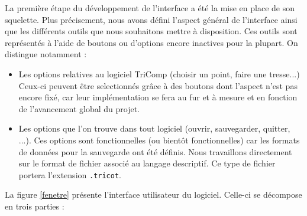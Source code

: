 \documentclass{article}
\begin{document}
La première étape du développement de l'interface a été la mise en place de son squelette. Plus précisement, nous avons défini l'aspect
général de l'interface ainsi que les différents outils que nous souhaitons mettre à disposition. Ces outils sont représentés à l'aide de
boutons ou d'options encore inactives pour la plupart. On distingue notamment :
\begin{itemize}
  \item Les options relatives au logiciel TriComp (choisir un point, faire une tresse...) Ceux-ci peuvent être selectionnés grâce à des
boutons dont l'aspect n'est pas encore fixé, car leur implémentation se fera au fur et à mesure et en fonction de l'avancement global du
projet.
  \item Les options que l'on trouve dans tout logiciel (ouvrir, sauvegarder, quitter, ...). Ces options sont fonctionnelles (ou bientôt
fonctionnelles) car les formats de données pour la sauvegarde ont été définis. Nous travaillons directement sur le format de fichier
associé au langage descriptif. Ce type de fichier portera l'extension \texttt{.tricot}.
\end{itemize}
La figure \ref{fenetre} présente l'interface utilisateur du logiciel. Celle-ci se décompose en trois parties : 
\end{document}

